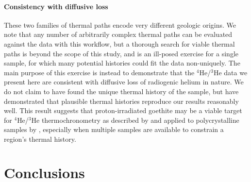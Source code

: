 \paragraph{Consistency with diffusive loss} These two families of thermal paths encode very different geologic origins. We 
note that any number of arbitrarily complex thermal paths can be evaluated against the data with 
this workflow, but a thorough search for viable thermal paths is beyond the scope 
of this study, and is an ill-posed exercise for a single sample, for which many potential histories could
fit the data non-uniquely. The main purpose of this exercise is instead to demonstrate that the $^4$He/$^3$He data we 
present here are consistent with diffusive loss of radiogenic helium in nature. We do not claim to 
have found the unique thermal history of the sample, but have demonstrated that plausible thermal histories 
reproduce our results reasonably well. This result suggests that proton-irradiated goethite may be a viable 
target for $^4$He/$^3$He thermochronometry as described by \citet{shusterfarley2004} and applied
to polycrystalline samples by \citet{farleyflowers2012}, especially when multiple samples are 
available to constrain a region's thermal history.

\section{Conclusions}\label{conclusions}

